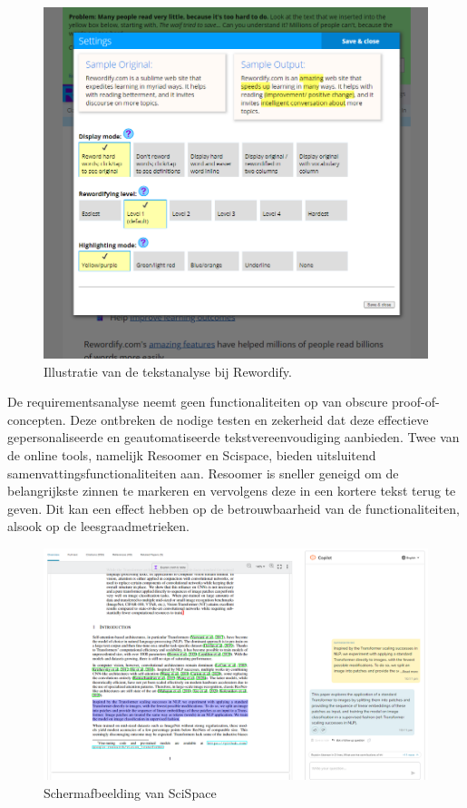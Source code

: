 \begin{figure}[H]
	\includegraphics[width=\linewidth]{img/scholarcy-attempt.png}
	\caption{Illustratie van de tekstanalyse bij Rewordify.}
	\label{img:scholarcy}
\end{figure}


De requirementsanalyse neemt geen functionaliteiten op van obscure proof-of-concepten. Deze ontbreken de nodige testen en zekerheid dat deze effectieve gepersonaliseerde en geautomatiseerde tekstvereenvoudiging aanbieden. Twee van de online tools, namelijk Resoomer en Scispace, bieden uitsluitend samenvattingsfunctionaliteiten aan. Resoomer is sneller geneigd om de belangrijkste zinnen te markeren en vervolgens deze in een kortere tekst terug te geven. Dit kan een effect hebben op de betrouwbaarheid van de functionaliteiten, alsook op de leesgraadmetrieken.

\begin{figure}[H]
	\includegraphics{img/typeset-example.png}
	\caption{Schermafbeelding van SciSpace}
\end{figure}

